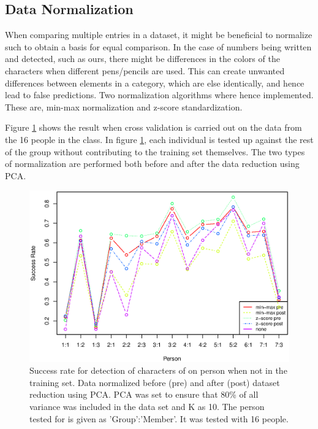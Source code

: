 \subsection{Data Normalization}
\label{sec:DataNormalization}
When comparing multiple entries in a dataset, it might be beneficial to normalize such to obtain a basis for equal comparison.
In the case of numbers being written and detected, such as ours, there might be differences in the colors of the characters when different pens/pencils are used.
This can create unwanted differences between elements in a category, which are else identically, and hence lead to false predictions.
Two normalization algorithms where hence implemented.
These are, min-max normalization and z-score standardization.

Figure \ref{fig:normalization_test_pre-post} shows the result when cross validation is carried out on the data from the 16 people in the class.
In figure \ref{fig:normalization_test_pre-post}, each individual is tested up against the rest of the group without contributing to the training set themselves. 
The two types of normalization are performed both before and after the data reduction using PCA.


\begin{figure}[H]
\centering
\includegraphics[width = \textwidth]{graphics/graph_normalization}
\caption[Comparison of different students.]{Success rate for detection of characters of on person when not in the training set. 
Data normalized before (pre) and after (post) dataset reduction using PCA.
PCA was set to ensure that 80\% of all variance was included in the data set and K as 10.
The person tested for is given as 'Group':'Member'.
It was tested with 16 people.}
\label{fig:normalization_test_pre-post}
\end{figure}

